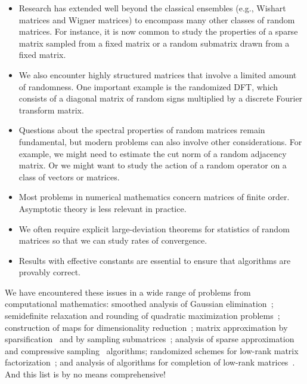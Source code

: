 \documentclass[11pt,letterpaper,twoside,reqno,draft]{amsart}
\theoremstyle{remark}
\numberwithin{equation}{section}
\numberwithin{thm}{section}
\begin{document}
\begin{itemize} \setlength{\itemsep}{0.5pc}
\item	Research has extended well {beyond the classical ensembles} (e.g., Wishart matrices and Wigner matrices) to encompass many other classes of random matrices.  For instance, it is now common to study the properties of a sparse matrix sampled from a fixed matrix or a random submatrix drawn from a fixed matrix.

\item	We also encounter highly structured matrices that involve a {limited amount of randomness}.  One important example is the randomized DFT, which consists of a diagonal matrix of random signs multiplied by a discrete Fourier transform matrix. 

\item	Questions about the spectral properties of random matrices remain fundamental, but modern problems can also involve other considerations.  For example, we might need to estimate the cut norm of a random adjacency matrix.  Or we might want to study the action of a random operator on a class of vectors or matrices.

\item	Most problems in numerical mathematics concern matrices of {finite order}.  Asymptotic theory is less relevant in practice.  

\item	We often require explicit {large-deviation theorems} for statistics of random matrices so that we can study rates of convergence. 

\item	Results with {effective constants} are essential to ensure that algorithms are provably correct.
\end{itemize}

We have encountered these issues in a wide range of problems from computational mathematics:
smoothed analysis of Gaussian elimination~\cite{SST06:Smoothed-Analysis};
semidefinite relaxation and rounding of quadratic maximization problems~\cite{Nem07:Sums-Random,So09:Moment-Inequalities};
construction of maps for dimensionality reduction~\cite{AC09:Fast-Johnson-Lindenstrauss};
matrix approximation by sparsification~\cite{AM07:Fast-Computation} and by sampling submatrices~\cite{RV07:Sampling-Large};
analysis of sparse approximation~\cite{Tro08:Conditioning-Random}
and compressive sampling~\cite{CR07:Sparsity-Incoherence} algorithms;
randomized schemes for low-rank matrix factorization~\cite{HMT11:Finding-Structure};
and analysis of algorithms for completion of low-rank matrices~\cite{Gro11:Recovering-Low-Rank,Rec09:Simpler-Approach}.
And this list is by no means comprehensive!
\end{document}
